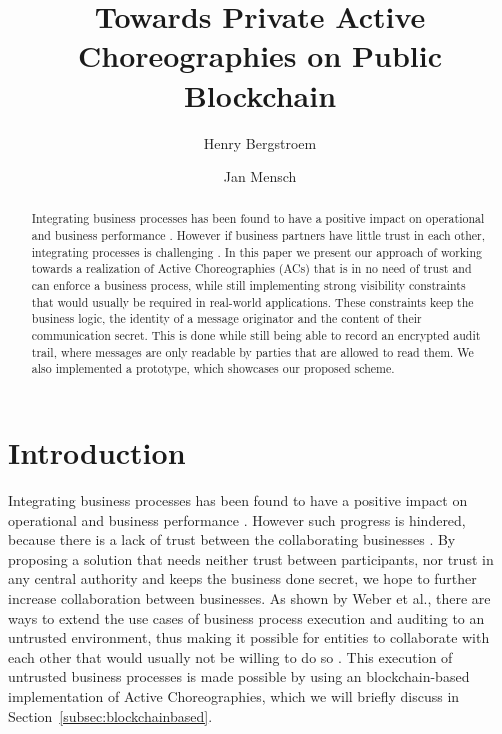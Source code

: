 \documentclass[runningheads]{llncs}
\newcommand{\refsec}[1]{Section~\ref{#1}}
\begin{document}
%
\title{Towards Private Active Choreographies on Public Blockchain }
%
%
\author{Henry Bergstroem \and
Jan Mensch}
%
%


%
\maketitle              %
%
\begin{abstract}
    Integrating business processes has been found to have a positive impact on operational and business performance \cite{flynn2010impact,narayanan2011antecedents}. However if business partners have little trust in each other, integrating processes is challenging \cite{panayides2009impact}. In this paper we present our approach of working towards a realization of Active Choreographies (ACs) that is in no need of trust and can enforce a business process, while still implementing strong visibility constraints that would usually be required in real-world applications. These constraints keep the business logic, the identity of a message originator and the content of their communication secret. This is done while still being able to record an encrypted audit trail, where messages are only readable by parties that are allowed to read them. We also implemented a  prototype, which showcases our proposed scheme.
\end{abstract}

\section{Introduction} \label{sec:intro}

Integrating business processes has been found to have a positive impact on operational and business performance \cite{flynn2010impact,narayanan2011antecedents}. However such progress is hindered, because there is a lack of trust between the collaborating businesses \cite{panayides2009impact}. By proposing a solution that needs neither trust between participants, nor trust in any central authority and keeps the business done secret, we hope to further increase collaboration between businesses. As shown by Weber et al., there are ways to extend the use cases of business process execution and auditing to an untrusted environment, thus making it possible for entities to collaborate with each other that would usually not be willing to do so \cite{weber2016untrusted}. This execution of untrusted business processes is made possible by using an blockchain-based implementation of Active Choreographies, which we will briefly discuss in \refsec{subsec:blockchainbased}.
\end{document}
